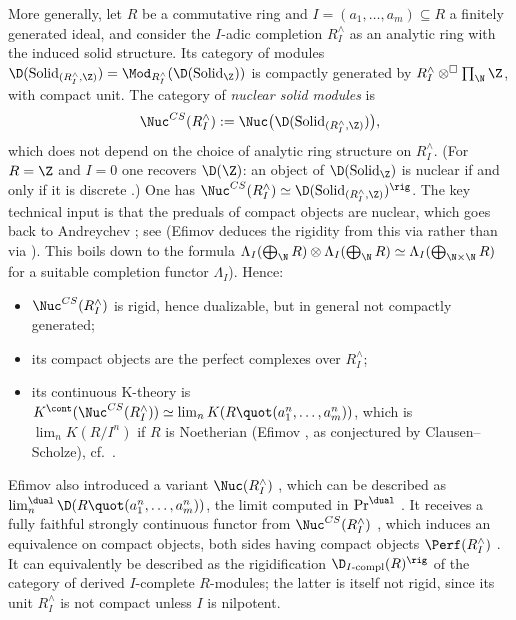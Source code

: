 \begin{example}
		More generally, let $R$ be a commutative ring and $I = (a_1,\dots,a_m) \subseteq R$ a finitely generated ideal, and consider the $I$-adic completion $R^{\wedge}_I$ as an analytic ring with the induced solid structure. Its category of modules $\D(\mathrm{Solid}_{(R^{\wedge}_I,\Z)}) = \Mod_{R^{\wedge}_I}(\D(\mathrm{Solid}_{\Z}))$ is compactly generated by $R^{\wedge}_I \otimes^{\square} \prod_{\N}\Z$, with compact unit. The category of \emph{nuclear solid modules} is
		\[
			\Nuc^{CS}(R^{\wedge}_I) := \Nuc\big(\D(\mathrm{Solid}_{(R^{\wedge}_I,\Z)})\big),
		\]
		which does not depend on the choice of analytic ring structure on $R^{\wedge}_I$. (For $R = \Z$ and $I = 0$ one recovers $\D(\Z)$: an object of $\D(\mathrm{Solid}_{\Z})$ is nuclear if and only if it is discrete \cite[Lecture~VIII, Exercise~1]{Clausen_Scholze_Complex_Geometry}.) One has $\Nuc^{CS}(R^{\wedge}_I) \simeq \D(\mathrm{Solid}_{(R^{\wedge}_I,\Z)})^{\rig}$. The key technical input is that the preduals of compact objects are nuclear, which goes back to Andreychev \cite[Lemma~3.8 and Korollar~3.14]{Andreychev_Thesis}; see \cite[Propositions~7.4 and~7.5]{Efimov_Inverse_Limits} (Efimov deduces the rigidity from this via \cite[Propositions~1.33 and~1.34]{Efimov_Inverse_Limits} rather than via ). This boils down to the formula $\Lambda_I(\bigoplus_{\N}R) \otimes \Lambda_I(\bigoplus_{\N}R) \simeq \Lambda_I(\bigoplus_{\N \times \N}R)$ for a suitable completion functor $\Lambda_I$). Hence:
		\begin{itemize}
			\item $\Nuc^{CS}(R^{\wedge}_I)$ is rigid, hence dualizable, but in general not compactly generated;
			\item its compact objects are the perfect complexes over $R^{\wedge}_I$;
			\item its continuous K-theory is $K^{\cont}(\Nuc^{CS}(R^{\wedge}_I)) \simeq \lim_n K(R \quot (a_1^n,\dots,a_m^n))$, which is $\lim_n K(R/I^n)$ if $R$ is Noetherian (Efimov \cite[Corollary~7.10]{Efimov_Inverse_Limits}, as conjectured by Clausen--Scholze), cf.\ .
		\end{itemize}
		Efimov also introduced a variant $\Nuc(R^{\wedge}_I)$ \cite[Definition~3.28]{Efimov_Inverse_Limits}, which can be described as $\lim^{\dual}_n \D(R \quot (a_1^n,\dots,a_m^n))$, the limit computed in $\Pr^{\dual}$ \cite[Proposition~5.23]{Efimov_Inverse_Limits}. It receives a fully faithful strongly continuous functor from $\Nuc^{CS}(R^{\wedge}_I)$ \cite[Corollary~7.6]{Efimov_Inverse_Limits}, which induces an equivalence on compact objects, both sides having compact objects $\Perf(R^{\wedge}_I)$ \cite[Proposition~3.29]{Efimov_Inverse_Limits}. It can equivalently be described as the rigidification $\D_{I\text{-}\mathrm{compl}}(R)^{\rig}$ \cite[Proposition~4.3]{Efimov_Inverse_Limits} of the category of derived $I$-complete $R$-modules; the latter is itself not rigid, since its unit $R^{\wedge}_I$ is not compact unless $I$ is nilpotent.
	\end{example}

